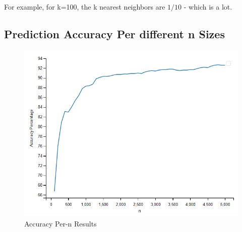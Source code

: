 \documentclass{article}
\begin{document}
    For example, for k=100, the k nearest neighbors are $1/10$ - which is a lot.

    \subsection{Prediction Accuracy Per different n Sizes}

    \begin{figure}[htp]
        \centering
        \includegraphics{images/q_2d}
        \caption{\label{fig:n-results}Accuracy Per-n Results}
    \end{figure}
\end{document}
